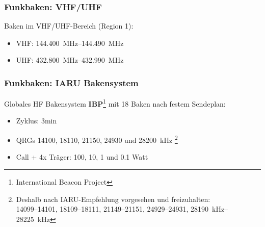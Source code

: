 \begin{frame}
  \frametitle{Funkbaken: VHF/UHF}

  Baken im VHF/UHF-Bereich (Region 1):

  \begin{itemize}
    \item VHF: \SIrange[range-phrase={ - }]{144,400}{144,490}{\mega\hertz}
    \item UHF: \SIrange[range-phrase={ - }]{432,800}{432,990}{\mega\hertz}
  \end{itemize}

\end{frame}

\begin{frame}
  \frametitle{Funkbaken: IARU Bakensystem}

  Globales HF Bakensystem \textbf{IBP}\footnote{International Beacon Project}
  mit 18 Baken nach festem Sendeplan:

  \begin{itemize}
    \item Zyklus: 3min
    \item QRGs \num{14100}, \num{18110}, \num{21150}, \num{24930} und \SI{28200}{\kilo\hertz}
      \footnote{Deshalb nach IARU-Empfehlung vorgesehen und freizuhalten: \\
      \scriptsize \numrange{14099}{14101}, \numrange{18109}{18111}, \numrange{21149}{21151}, \numrange{24929}{24931}, \SIrange{28190}{28225}{\kilo\hertz}}
    \item Call + 4x Träger: 100, 10, 1 und \num{0,1} Watt
  \end{itemize}

\end{frame}

